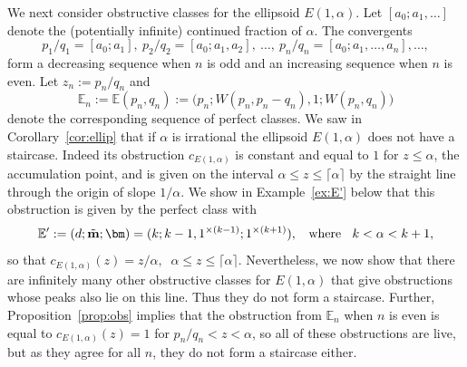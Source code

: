 \documentclass[11pt, reqno]{amsart}
\theoremstyle{remark}
\numberwithin{equation}{subsection}
\numberwithin{figure}{section}
\theoremstyle{customremark}
\newcommand{\bE}{{\mathbb E}}
\newcommand{\al}{{\alpha}}
\newcommand{\MS}{{\medskip}}
\begin{document}
We next consider obstructive classes for the ellipsoid $E(1,\al)$. Let $[a_0;a_1,\hdots]$ denote the (potentially infinite) continued fraction of $\al$. The convergents $$
p_1/q_1=[a_0;a_1],\ p_2/q_2=[a_0;a_1,a_2],\ \hdots,\ p_{n}/q_{n}=[a_0;a_1,\hdots,a_{n}],\hdots,
$$
form a decreasing sequence when $n$ is odd and an increasing sequence when $n$ is even. 
Let $z_{n}:=p_{n}/q_{n}$ and
\[ \bE_n:=\bE(p_n,q_n):=\bigl(p_{n};W(p_{n},p_{n}-q_{n}),1; W(p_{n},q_{n})\bigr)
\]
denote the corresponding sequence of perfect  classes. 
We saw in Corollary~\ref{cor:ellip} that if $\al$ is irrational the ellipsoid $E(1,\al)$ does not have a staircase. Indeed its obstruction $c_{E(1,\al)}$ is constant and equal to $1$ for $z\le \al$, the accumulation point, and  is given on the interval $ \al \le z\le  \lceil \al\rceil$ by the straight line through the origin of slope $1/\al$.  We show in Example~\ref{ex:E'} below  that this obstruction is given by the perfect class
with $$
\bE': = (d;\Tilde{\bf m}; \bm) = (k; k-1, 1^{\times (k-1)}; 1^{\times (k+1)}), \;\;\mbox { where } \;\; k<\al < k+1,
$$
so that $c_{E(1,\al)}(z) = z/\al, \;\; \al\le z\le \lceil \al\rceil$. 
 Nevertheless, we now show that there are infinitely many other obstructive classes for $E(1,\al)$ that give obstructions 
 whose peaks also lie on this line. Thus they do not form a staircase. Further, Proposition~\ref{prop:obs} implies that the obstruction from $\bE_n$ when $n$ is even is equal to $c_{E(1,\al)}(z)=1$ for $p_n/q_n<z<\al$, so all of these obstructions are live, but as they agree for all $n$, they do not form a staircase either. 
 \MS
 
\end{document}
